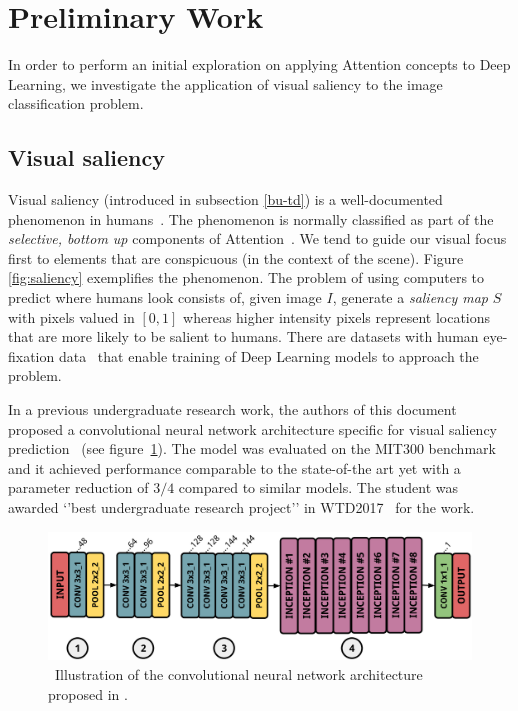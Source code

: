 \documentclass[12pt]{article}
\begin{document}
\section{Preliminary Work}
In order to perform an initial exploration on applying Attention concepts to Deep Learning,
we investigate the application of visual saliency to the image classification problem.

\subsection{Visual saliency}
Visual saliency (introduced in subsection \ref{bu-td}) is a well-documented phenomenon in
humans~\cite{ref:guided-search}\cite{ref:fit}.
The phenomenon is normally classified as part of the \emph{selective, bottom up} components of
Attention~\cite{ref:vocus}.
We tend to guide our visual focus first to elements that are conspicuous (in the context of the scene).
Figure \ref{fig:saliency} exemplifies the phenomenon.
The problem of using computers to predict where humans look
consists of, given image $I$, generate a \emph{saliency map} $S$ with pixels valued in $[0, 1]$ whereas
higher intensity pixels represent locations that are more likely to be salient to humans.
There are datasets with human eye-fixation data~\cite{ref:salicon-dataset}
that enable training of Deep Learning models to approach the problem.

In a previous undergraduate research work, the authors of this document proposed a convolutional neural
network architecture specific for visual saliency prediction~\cite{ref:erik-esther}
(see figure~\ref{fig:deeppeek}).
The model was evaluated on the MIT300 benchmark~\cite{ref:mit-bm} and it achieved performance comparable
to the state-of-the art yet with a parameter reduction of $3/4$ compared to similar models.
The student was awarded `'best undergraduate research project''
in WTD2017~\cite{ref:wtd2017} for the work.

\begin{figure}
\begin{center}
	\includegraphics[width=0.7\linewidth]{./img/deeppeek.png}
\caption{\
    Illustration of the convolutional neural network architecture proposed in \cite{ref:erik-esther}.
}
\label{fig:deeppeek}
\end{center}
\end{figure}
\end{document}
